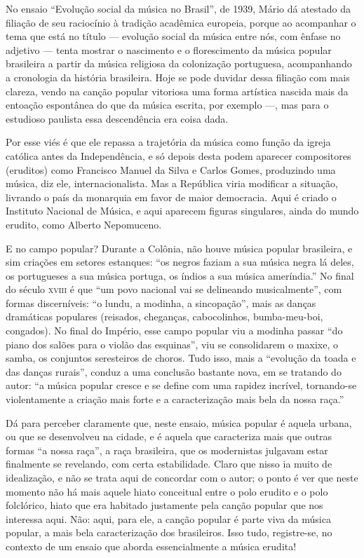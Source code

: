 No ensaio ``Evolução social da música no Brasil'', de 1939, Mário dá
atestado da filiação de seu raciocínio à tradição acadêmica europeia,
porque ao acompanhar o tema que está no título --- evolução social
da música entre nós, com ênfase no adjetivo --- tenta mostrar o
nascimento e o florescimento da música popular brasileira a partir da
música religiosa da colonização portuguesa, acompanhando a cronologia da
história brasileira. Hoje se pode duvidar dessa filiação com mais
clareza, vendo na canção popular vitoriosa uma forma artística nascida
mais da entoação espontânea do que da música escrita, por exemplo ---,
mas para o estudioso paulista essa descendência era coisa dada.

Por esse viés é que ele repassa a trajetória da música como função da
igreja católica antes da Independência, e só depois desta podem aparecer
compositores (eruditos) como Francisco Manuel da Silva e Carlos Gomes,
produzindo uma música, diz ele, internacionalista. Mas a República viria
modificar a situação, livrando o país da monarquia em favor de maior
democracia. Aqui é criado o Instituto Nacional de Música, e aqui
aparecem figuras singulares, ainda do mundo erudito, como Alberto
Nepomuceno.

E no campo popular? Durante a Colônia, não houve música popular
brasileira, e sim criações em setores estanques: ``os negros faziam a
sua música negra lá deles, os portugueses a sua música portuga, os
índios a sua música ameríndia.'' No final do século \textsc{xviii} é que ``um povo
nacional vai se delineando musicalmente'', com formas discerníveis: ``o
lundu, a modinha, a sincopação'', mais as danças dramáticas populares
(reisados, cheganças, cabocolinhos, bumba-meu-boi, congados). No final
do Império, esse campo popular viu a modinha passar ``do piano dos
salões para o violão das esquinas'', viu se consolidarem o maxixe, o
samba, os conjuntos seresteiros de choros. Tudo isso, mais a ``evolução
da toada e das danças rurais'', conduz a uma conclusão bastante nova, em
se tratando do autor: ``a música popular cresce e se define com uma
rapidez incrível, tornando-se violentamente a criação mais forte e a
caracterização mais bela da nossa raça.''

Dá para perceber claramente que, neste ensaio, música popular é
aquela urbana, ou que se desenvolveu na cidade, e é aquela que
caracteriza mais que outras formas ``a nossa raça'', a raça brasileira,
que os modernistas julgavam estar finalmente se revelando, com certa
estabilidade. Claro que nisso ia muito de idealização, e não se trata
aqui de concordar com o autor; o ponto é ver que neste momento não há
mais aquele hiato conceitual entre o polo erudito e o polo folclórico,
hiato que era habitado justamente pela canção popular que nos interessa
aqui. Não: aqui, para ele, a canção popular é parte viva da música
popular, a mais bela caracterização dos brasileiros. Isso tudo,
registre-se, no contexto de um ensaio que aborda essencialmente a música
erudita!

